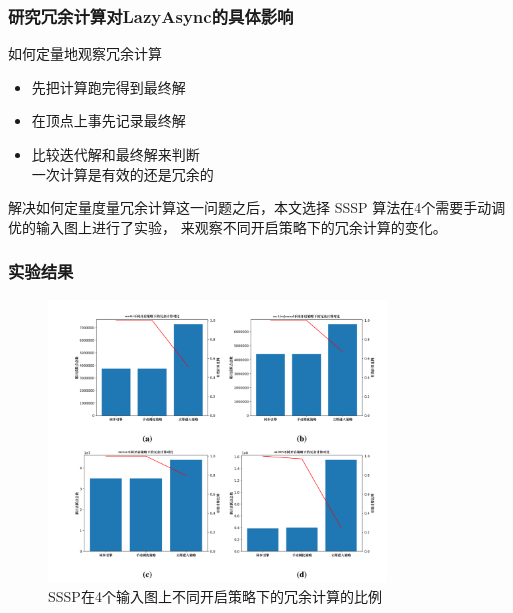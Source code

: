 \documentclass[10pt]{beamer}
\begin{document}
\begin{frame}%
  \frametitle{研究冗余计算对LazyAsync的具体影响}
  \begin{block}
    {如何定量地观察冗余计算}
    \begin{itemize}
      \item 先把计算跑完得到最终解
      \item 在顶点上事先记录最终解
      \item 比较迭代解和最终解来判断\\
      一次计算是有效的还是冗余的
    \end{itemize}
  \end{block}

  \vspace{2em}

  解决如何定量度量冗余计算这一问题之后，本文选择 SSSP 算法在4个需要手动调优的输入图上进行了实验，
  来观察不同开启策略下的冗余计算的变化。
\end{frame}

\begin{frame}%
  \frametitle{实验结果}
  \begin{figure}[!htbp]
    \centering
    \includegraphics[width=0.8\textwidth]{Img/all_useful.png}
    \caption[]{SSSP在4个输入图上不同开启策略下的冗余计算的比例 }
  \end{figure}
\end{frame}
\end{document}
